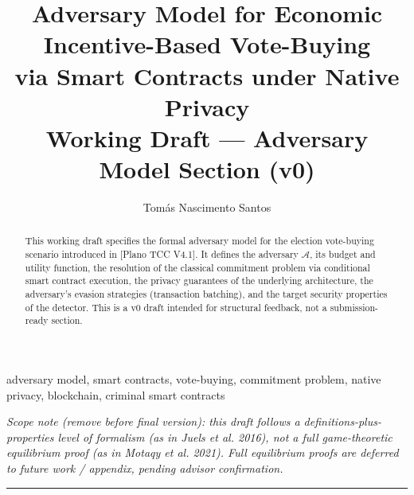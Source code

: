 \documentclass[journal,onecolumn,11pt]{IEEEtran}
\begin{document}
\title{Adversary Model for Economic Incentive-Based Vote-Buying \\
via Smart Contracts under Native Privacy \\
\large Working Draft --- Adversary Model Section (v0)}

\author{Tomás Nascimento Santos}
\maketitle

\begin{abstract}
This working draft specifies the formal adversary model for the election
vote-buying scenario introduced in [Plano TCC V4.1]. It defines the
adversary $\mathcal{A}$, its budget and utility function, the resolution
of the classical commitment problem via conditional smart contract
execution, the privacy guarantees of the underlying architecture,
the adversary's evasion strategies (transaction batching), and the
target security properties of the detector. This is a v0 draft intended
for structural feedback, not a submission-ready section.
\end{abstract}

\begin{IEEEkeywords}
adversary model, smart contracts, vote-buying, commitment problem,
native privacy, blockchain, criminal smart contracts
\end{IEEEkeywords}

\textit{Scope note (remove before final version): this draft follows a
definitions-plus-properties level of formalism (as in Juels et al. 2016),
not a full game-theoretic equilibrium proof (as in Motaqy et al. 2021).
Full equilibrium proofs are deferred to future work / appendix, pending
advisor confirmation.}

\bigskip
\hrule
\bigskip

\end{document}
